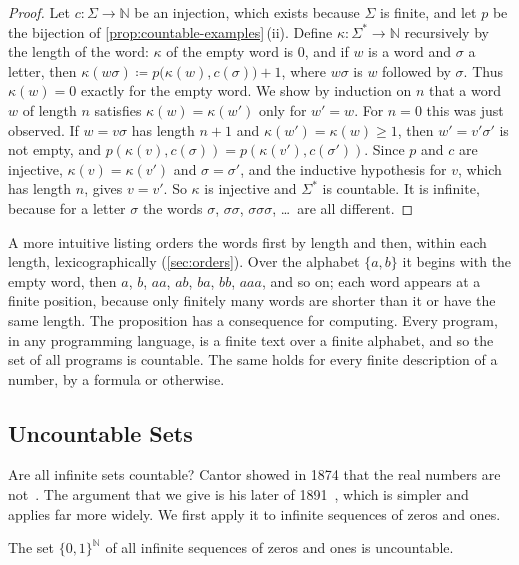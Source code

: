 \begin{proof}
Let $c\colon\Sigma\to\mathbb N$ be an injection, which exists because $\Sigma$ is finite, and let $p$ be the bijection of \cref{prop:countable-examples}\,(ii). Define $\kappa\colon\Sigma^*\to\mathbb N$ recursively by the length of the word: $\kappa$ of the empty word is $0$, and if $w$ is a word and $\sigma$ a letter, then $\kappa(w\sigma)\coloneqq p\bigl(\kappa(w),c(\sigma)\bigr)+1$, where $w\sigma$ is $w$ followed by $\sigma$. Thus $\kappa(w)=0$ exactly for the empty word. We show by induction on $n$ that a word $w$ of length $n$ satisfies $\kappa(w)=\kappa(w')$ only for $w'=w$. For $n=0$ this was just observed. If $w=v\sigma$ has length $n+1$ and $\kappa(w')=\kappa(w)\ge1$, then $w'=v'\sigma'$ is not empty, and $p(\kappa(v),c(\sigma))=p(\kappa(v'),c(\sigma'))$. Since $p$ and $c$ are injective, $\kappa(v)=\kappa(v')$ and $\sigma=\sigma'$, and the inductive hypothesis for $v$, which has length $n$, gives $v=v'$. So $\kappa$ is injective and $\Sigma^*$ is countable. It is infinite, because for a letter $\sigma$ the words $\sigma$, $\sigma\sigma$, $\sigma\sigma\sigma$, \ldots\ are all different.
\end{proof}

A more intuitive listing orders the words first by length and then, within each length, lexicographically (\cref{sec:orders}). Over the alphabet $\{a,b\}$ it begins with the empty word, then $a$, $b$, $aa$, $ab$, $ba$, $bb$, $aaa$, and so on; each word appears at a finite position, because only finitely many words are shorter than it or have the same length. The proposition has a consequence for computing. Every program, in any programming language, is a finite text over a finite alphabet, and so the set of all programs is countable. The same holds for every finite description of a number, by a formula or otherwise.

\subsection{Uncountable Sets}

Are all infinite sets countable? Cantor showed in 1874 that the real numbers are not~\cite{cantor1874}. The argument that we give is his later  of 1891~\cite{cantor1891}, which is simpler and applies far more widely. We first apply it to infinite sequences of zeros and ones.

\begin{theorem}
\label{thm:binary-sequences}
The set $\{0,1\}^{\mathbb N}$ of all infinite sequences of zeros and ones is uncountable.
\end{theorem}

